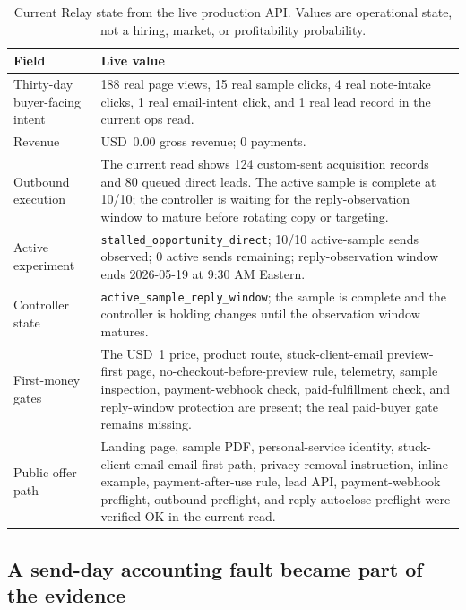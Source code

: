 \documentclass[12pt,letterpaper]{article}
\begin{document}
\begin{table}[tbp]
\centering
\small
\caption{Current Relay state from the live production API. Values are operational state, not a hiring, market, or profitability probability.}
\label{tab:current_state}
\begin{tabularx}{\textwidth}{L{0.27\textwidth}Y}
\toprule
{}
\textbf{Field} & \textbf{Live value} \\
\midrule
Thirty-day buyer-facing intent & 188 real page views, 15 real sample clicks, 4 real note-intake clicks, 1 real email-intent click, and 1 real lead record in the current ops read. \\
Revenue & USD~0.00 gross revenue; 0 payments. \\
Outbound execution & The current read shows 124 custom-sent acquisition records and 80 queued direct leads. The active sample is complete at 10/10; the controller is waiting for the reply-observation window to mature before rotating copy or targeting. \\
Active experiment & \texttt{stalled\_opportunity\_direct}; 10/10 active-sample sends observed; 0 active sends remaining; reply-observation window ends 2026-05-19 at 9:30 AM Eastern. \\
Controller state & \texttt{active\_sample\_reply\_window}; the sample is complete and the controller is holding changes until the observation window matures. \\
First-money gates & The USD~1 price, product route, stuck-client-email preview-first page, no-checkout-before-preview rule, telemetry, sample inspection, payment-webhook check, paid-fulfillment check, and reply-window protection are present; the real paid-buyer gate remains missing. \\
Public offer path & Landing page, sample PDF, personal-service identity, stuck-client-email email-first path, privacy-removal instruction, inline example, payment-after-use rule, lead API, payment-webhook preflight, outbound preflight, and reply-autoclose preflight were verified OK in the current read. \\
\bottomrule
\end{tabularx}
\end{table}

\subsection{A send-day accounting fault became part of the evidence}
\end{document}

